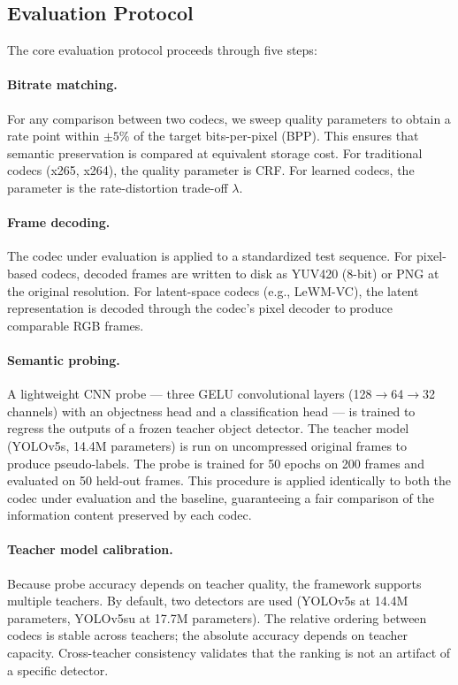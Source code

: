 \documentclass{article}
\begin{document}
\subsection{Evaluation Protocol}

The core evaluation protocol proceeds through five steps:

\paragraph{Bitrate matching.}
For any comparison between two codecs, we sweep quality parameters to obtain a rate point within $\pm 5\%$ of the target bits-per-pixel (BPP). This ensures that semantic preservation is compared at equivalent storage cost. For traditional codecs (x265, x264), the quality parameter is CRF. For learned codecs, the parameter is the rate-distortion trade-off $\lambda$.

\paragraph{Frame decoding.}
The codec under evaluation is applied to a standardized test sequence. For pixel-based codecs, decoded frames are written to disk as YUV420 (8-bit) or PNG at the original resolution. For latent-space codecs (e.g., LeWM-VC), the latent representation is decoded through the codec's pixel decoder to produce comparable RGB frames.

\paragraph{Semantic probing.}
A lightweight CNN probe --- three GELU convolutional layers (128$\to$64$\to$32 channels) with an objectness head and a classification head --- is trained to regress the outputs of a frozen teacher object detector. The teacher model (YOLOv5s, 14.4M parameters) is run on uncompressed original frames to produce pseudo-labels. The probe is trained for 50 epochs on 200 frames and evaluated on 50 held-out frames. This procedure is applied identically to both the codec under evaluation and the baseline, guaranteeing a fair comparison of the information content preserved by each codec.

\paragraph{Teacher model calibration.}
Because probe accuracy depends on teacher quality, the framework supports multiple teachers. By default, two detectors are used (YOLOv5s at 14.4M parameters, YOLOv5su at 17.7M parameters). The relative ordering between codecs is stable across teachers; the absolute accuracy depends on teacher capacity. Cross-teacher consistency validates that the ranking is not an artifact of a specific detector.
\end{document}

